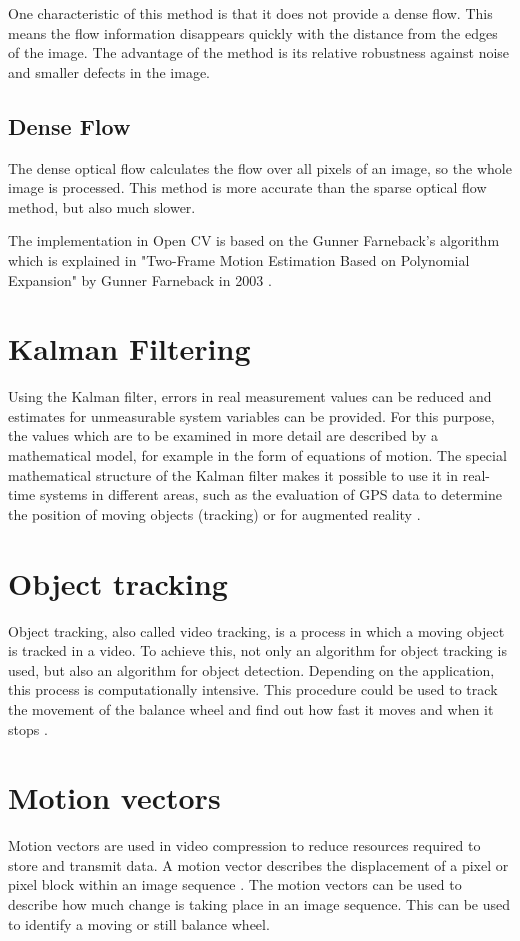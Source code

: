 \documentclass[12pt, a4paper]{report}
\begin{document}
    One characteristic of this method is that it does not provide a dense flow. This means the flow information disappears quickly with the distance from the edges of the image. The advantage of the method is its relative robustness against noise and smaller defects in the image.
    
       \subsection{Dense Flow}
The dense optical flow calculates the flow over all pixels of an image, so the whole image is processed. This method is more accurate than the sparse optical flow method, but also much slower.

The implementation in Open CV is based on the Gunner Farneback's algorithm which is explained in "Two-Frame Motion Estimation Based on Polynomial Expansion" by Gunner Farneback in 2003 \cite{Farneback2003}.
  
   \section{Kalman Filtering} 
   Using the Kalman filter, errors in real measurement values can be reduced and estimates for unmeasurable system variables can be provided. For this purpose, the values which are to be examined in more detail are described by a mathematical model, for example in the form of equations of motion. The special mathematical structure of the Kalman filter makes it possible to use it in real-time systems in different areas, such as the evaluation of GPS data to determine the position of moving objects (tracking) or for augmented reality \cite[ch. 1.2]{Grewal1993}.
   
   \section{Object tracking}
   Object tracking, also called video tracking, is a process in which a moving object is tracked in a video. To achieve this, not only an algorithm for object tracking is used, but also an algorithm for object detection. Depending on the application, this process is computationally intensive. This procedure could be used to track the movement of the balance wheel and find out how fast it moves and when it stops \cite{objectTracking}.
    
 \section{Motion vectors}
 Motion vectors are used in video compression to reduce resources required to store and transmit data. A motion vector describes the displacement of a pixel or pixel block within an image sequence \cite{Motionvector}. 
 The motion vectors can be used to describe how much change is taking place in an image sequence. This can be used to identify a moving or still balance wheel.
    
\end{document}
